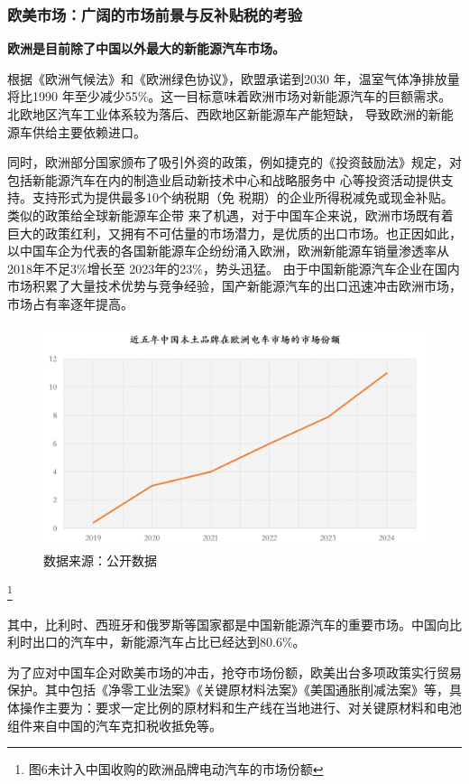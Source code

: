 \documentclass[a4paper, 10pt]{article}
\begin{document}
    \subsubsection{欧美市场：广阔的市场前景与反补贴税的考验}
    \textbf{欧洲是目前除了中国以外最大的新能源汽车市场。}
    
    根据《欧洲气候法》和《欧洲绿色协议》，欧盟承诺到2030 年，温室气体净排放量将比1990 年至少减少55\%。这一目标意味着欧洲市场对新能源汽车的巨额需求。
    北欧地区汽车工业体系较为落后、西欧地区新能源车产能短缺，
导致欧洲的新能源车供给主要依赖进口。

同时，欧洲部分国家颁布了吸引外资的政策，例如捷克的《投资鼓励法》规定，对包括新能源汽车在内的制造业启动新技术中心和战略服务中
心等投资活动提供支持。支持形式为提供最多10个纳税期（免
税期）的企业所得税减免或现金补贴。类似的政策给全球新能源车企带
来了机遇，对于中国车企来说，欧洲市场既有着巨大的政策红利，又拥有不可估量的市场潜力，是优质的出口市场。也正因如此，以中国车企为代表的各国新能源车企纷纷涌入欧洲，欧洲新能源车销量渗透率从2018年不足3\%增长至
2023年的23\%，势头迅猛。
    由于中国新能源汽车企业在国内市场积累了大量技术优势与竞争经验，国产新能源汽车的出口迅速冲击欧洲市场，市场占有率逐年提高。
    \begin{figure}[ht]
      \centering 
      \includegraphics[height=6.5cm,width=11.3cm]{fg7.png}
      
      \caption{数据来源：公开数据 }
      \label{6}
    \end{figure}\footnote{图6未计入中国收购的欧洲品牌电动汽车的市场份额}
    
其中，比利时、西班牙和俄罗斯等国家都是中国新能源汽车的重要市场。中国向比利时出口的汽车中，新能源汽车占比已经达到80.6\%。

    为了应对中国车企对欧美市场的冲击，抢夺市场份额，欧美出台多项政策实行贸易保护。其中包括《净零工业法案》《关键原材料法案》《美国通胀削减法案》等，具体操作主要为：要求一定比例的原材料和生产线在当地进行、对关键原材料和电池组件来自中国的汽车克扣税收抵免等。
\end{document}
